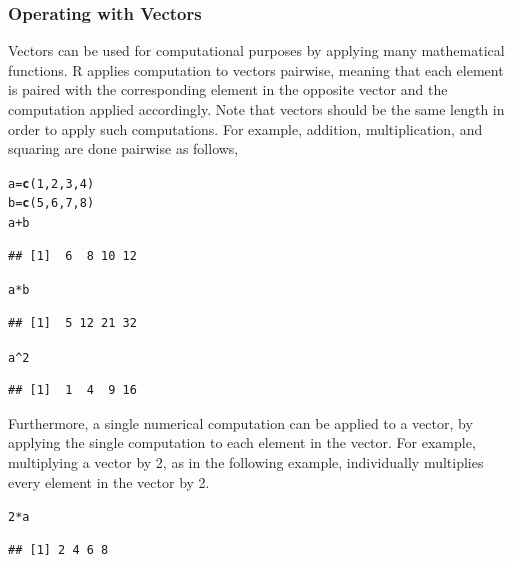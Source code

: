 \documentclass{report}\usepackage[]{graphicx}\usepackage[]{color}
\makeatletter
\newcommand{\hlnum}[1]{\textcolor[rgb]{0.686,0.059,0.569}{#1}}%
\newcommand{\hlopt}[1]{\textcolor[rgb]{0,0,0}{#1}}%
\newcommand{\hlstd}[1]{\textcolor[rgb]{0.345,0.345,0.345}{#1}}%
\newcommand{\hlkwb}[1]{\textcolor[rgb]{0.69,0.353,0.396}{#1}}%
\newcommand{\hlkwd}[1]{\textcolor[rgb]{0.737,0.353,0.396}{\textbf{#1}}}%
\newenvironment{kframe}{%
 \def\at@end@of@kframe{}%
 \ifinner\ifhmode%
  \def\at@end@of@kframe{\end{minipage}}%
  \begin{minipage}{\columnwidth}%
 \fi\fi%
 \def\FrameCommand##1{\hskip\@totalleftmargin \hskip-\fboxsep
 \colorbox{shadecolor}{##1}\hskip-\fboxsep
     \hskip-\linewidth \hskip-\@totalleftmargin \hskip\columnwidth}%
 \MakeFramed {\advance\hsize-\width
   \@totalleftmargin\z@ \linewidth\hsize
   \@setminipage}}%
 {\par\unskip\endMakeFramed%
 \at@end@of@kframe}
\newenvironment{knitrout}{}{} %
\makeatother
\begin{document}
\subsubsection{Operating with Vectors}
Vectors can be used for computational purposes by applying many mathematical functions.  \textsf{R} applies computation to vectors pairwise, meaning that each element is paired with the corresponding element in the opposite vector and the computation applied accordingly. Note that vectors should be the same length in order to apply such computations. For example, addition, multiplication, and squaring are done pairwise as follows, 
\begin{knitrout}
\color{fgcolor}\begin{kframe}
\begin{alltt}
\hlstd{a} \hlkwb{=} \hlkwd{c}\hlstd{(}\hlnum{1}\hlstd{,}\hlnum{2}\hlstd{,}\hlnum{3}\hlstd{,}\hlnum{4}\hlstd{)}
\hlstd{b} \hlkwb{=} \hlkwd{c}\hlstd{(}\hlnum{5}\hlstd{,}\hlnum{6}\hlstd{,}\hlnum{7}\hlstd{,}\hlnum{8}\hlstd{)}
\hlstd{a}\hlopt{+}\hlstd{b}
\end{alltt}
\begin{verbatim}
## [1]  6  8 10 12
\end{verbatim}
\begin{alltt}
\hlstd{a}\hlopt{*}\hlstd{b}
\end{alltt}
\begin{verbatim}
## [1]  5 12 21 32
\end{verbatim}
\begin{alltt}
\hlstd{a}\hlopt{^}\hlnum{2}
\end{alltt}
\begin{verbatim}
## [1]  1  4  9 16
\end{verbatim}
\end{kframe}
\end{knitrout}

Furthermore, a single numerical computation can be applied to a vector, by applying the single computation to each element in the vector.  For example, multiplying a vector by 2, as in the following example, individually multiplies every element in the vector by 2.
\begin{knitrout}
\color{fgcolor}\begin{kframe}
\begin{alltt}
\hlnum{2}\hlopt{*}\hlstd{a}
\end{alltt}
\begin{verbatim}
## [1] 2 4 6 8
\end{verbatim}
\end{kframe}
\end{knitrout}
\end{document}
